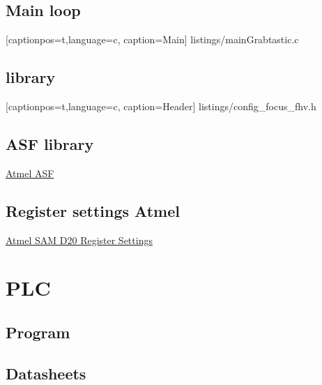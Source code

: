 \documentclass[a4paper,12pt]{scrreprt}
\begin{document}
\section{Main loop}
  
    [captionpos=t,language=c, caption=Main]
{listings/mainGrabtastic.c}
 
 \section{library}
  
    [captionpos=t,language=c, caption=Header]
 {listings/config_focus_fhv.h}

\section{\acs{ASF} library}

\href{http://www.atmel.com/images/atmel-42139-asf-manual-sam-d20_application-note_at03665.pdf}{Atmel \acs{ASF}}

\section{Register settings Atmel}

\href{http://www.atmel.com/images/atmel-42129-sam-d20_datasheet.pdf}{Atmel SAM D20 Register Settings}

\chapter{\acs{PLC}}





\section{Program}


\section{Datasheets}



\end{document}
